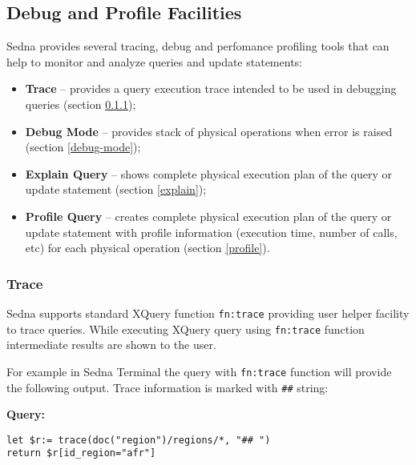 \documentclass[a4paper,12pt]{article}
\begin{document}
\subsection{Debug and Profile Facilities}

Sedna provides several tracing, debug and perfomance profiling tools that can
help to monitor and analyze queries and update statements:

\begin{itemize}
\item\textbf{Trace} -- provides a query execution trace intended to be used in
debugging queries (section \ref{trace});
\item\textbf{Debug Mode} -- provides stack of physical operations when error is
raised (section \ref{debug-mode});
\item\textbf{Explain Query} -- shows complete physical execution plan of the
query or update statement (section \ref{explain});
\item\textbf{Profile Query} -- creates complete physical execution plan of the
query or update statement with profile information (execution time, number of
calls, etc) for each physical operation (section \ref{profile}).
\end{itemize}


\subsubsection{Trace}
\label{trace}

Sedna supports standard XQuery function \verb!fn:trace! \cite{paper:query-fo}
providing user helper facility to trace queries. While executing XQuery query
using \verb!fn:trace! function intermediate results are shown to the user.

For example in Sedna Terminal the query with \verb!fn:trace! function will
provide the following output. Trace information is marked with \verb!##! string:

\medskip
\noindent
\textbf{Query:}
\begin{verbatim}
let $r:= trace(doc("region")/regions/*, "## ")
return $r[id_region="afr"]
\end{verbatim}
\end{document}
